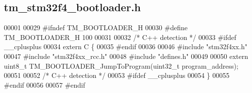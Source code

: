 \hypertarget{tm__stm32f4__bootloader_8h_source}{}\subsection{tm\+\_\+stm32f4\+\_\+bootloader.\+h}

\begin{DoxyCode}
00001 
00029 \textcolor{preprocessor}{#ifndef TM\_BOOTLOADER\_H}
00030 \textcolor{preprocessor}{#define TM\_BOOTLOADER\_H 100}
00031 
00032 \textcolor{comment}{/* C++ detection */}
00033 \textcolor{preprocessor}{#ifdef \_\_cplusplus}
00034 \textcolor{keyword}{extern} C \{
00035 \textcolor{preprocessor}{#endif}
00036 
00046 \textcolor{preprocessor}{#include "stm32f4xx.h"}
00047 \textcolor{preprocessor}{#include "stm32f4xx\_rcc.h"}
00048 \textcolor{preprocessor}{#include "defines.h"}
00049     
00050 \textcolor{keyword}{extern} uint8\_t TM\_BOOTLOADER\_JumpToProgram(uint32\_t program\_address);
00051 
00052 \textcolor{comment}{/* C++ detection */}
00053 \textcolor{preprocessor}{#ifdef \_\_cplusplus}
00054 \}
00055 \textcolor{preprocessor}{#endif}
00056 
00057 \textcolor{preprocessor}{#endif}
\end{DoxyCode}
